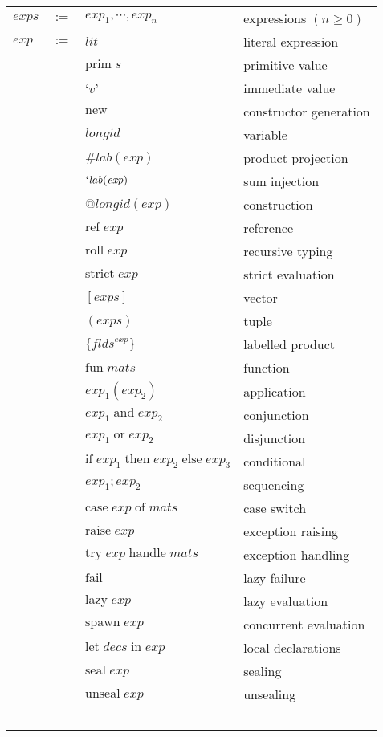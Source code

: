 \documentclass[twoside]{article}
\newcommand{\x}[1]{\mathit{#1}}
\newcommand{\f}[1]{\mbox{#1}}
\newcommand{\lab}{\x{lab}}
\newcommand{\longid}{\x{longid}}
\newcommand{\lit}{\x{lit}}
\renewcommand{\exp}{\x{exp}}
\newcommand{\exps}{\x{exps}}
\newcommand{\flds}{\x{flds}}
\newcommand{\mats}{\x{mats}}
\newcommand{\decs}{\x{decs}}
\begin{document}
\begin{center}
\begin{tabular}{lcll}

$\exps$	&$:=$&	$\exp_1,\cdots,\exp_n$		& expressions $(n\geq0)$ \\
$\exp$	&$:=$&	$\lit$				& literal expression \\
	&&	$\f{prim}\;\x{s}$		& primitive value \\
	&&	`$v$'				& immediate value \\
	&&	$\f{new}$			& constructor generation \\
	&&	$\longid$			& variable \\
	&&	$\#\lab(\exp)$			& product projection \\
	&&	$`\lab(\exp)$			& sum injection \\
	&&	$@\longid(\exp)$		& construction \\
	&&	$\f{ref}\;\exp$			& reference \\
	&&	$\f{roll}\;\exp$		& recursive typing \\
	&&	$\f{strict}\;\exp$		& strict evaluation \\
	&&	$[\exps]$			& vector \\
	&&	$(\exps)$			& tuple \\
	&&	$\{\flds^\exp\}$		& labelled product \\
	&&	$\f{fun}\;\mats$		& function \\
	&&	$\exp_1(\exp_2)$		& application \\
	&&	$\exp_1\;\f{and}\;\exp_2$	& conjunction \\
	&&	$\exp_1\;\f{or}\;\exp_2$	& disjunction \\
	&&	$\f{if}\;\exp_1\;\f{then}\;\exp_2\;\f{else}\;\exp_3$
						& conditional \\
	&&	$\exp_1;\exp_2$			& sequencing \\
	&&	$\f{case}\;\exp\;\f{of}\;\mats$ & case switch \\
	&&	$\f{raise}\;\exp$		& exception raising \\
	&&	$\f{try}\;\exp\;\f{handle}\;\mats$ & exception handling \\
	&&	$\f{fail}$			& lazy failure \\
	&&	$\f{lazy}\;\exp$		& lazy evaluation \\
	&&	$\f{spawn}\;\exp$		& concurrent evaluation \\
	&&	$\f{let}\;\decs\;\f{in}\;\exp$	& local declarations \\
	&&	$\f{seal}\;\exp$		& sealing \\
	&&	$\f{unseal}\;\exp$		& unsealing \\
\ \\


\end{tabular}
\end{center}
\end{document}
